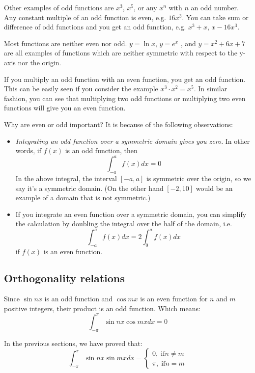 \documentclass[12pt]{report}
\begin{document}
Other examples of odd functions are $x^3$, $x^5$,  or any $x^n$ with $n$ an odd number. Any constant multiple of an odd function is even, e.g. $16x^3$.  You can take sum or difference of odd functions and you get an odd function, e.g. $x^3+x$, $x - 16x^3 $.

Most functions are neither even nor odd. $y= \ln x$, $y = e^x$ , and $y= x^2+6x+7$ are all examples of functions which are neither symmetric with respect to the y-axis nor the origin.

If you multiply an odd function with an even function, you get an odd function. This can be easily seen if you consider the example $x^3 \cdot x^2 = x^5 $. In similar fashion, you can see that multiplying two odd functions or multiplying two even functions will give you an even function.

Why are even or odd important? It is because of the following observations:

\begin{itemize}
\item  \textit{Integrating an odd function over a symmetric domain gives you zero}. In other words, if $f(x)$ is an odd function, then
$$\int_{-a}^{a} f(x) dx =0$$
In the above integral, the interval $[-a,a]$ is symmetric over the origin, so we say it's a symmetric domain. (On the other hand $[-2,10]$ would be an example of a domain that is not symmetric.)

\item  If you integrate an even function over a symmetric domain, you can simplify the calculation by doubling the integral over the half of the domain, i.e.
$$\int_{-a}^{a} f(x) dx = 2 \int_{0}^{a} f(x) dx $$
if $f(x)$ is an even function.
\end{itemize}
	
\subsection*{Orthogonality relations}

Since $\sin nx$ is an odd function and $\cos mx$ is an even function for $n$ and $m$ positive integers, their product is an odd function. Which means:
$$\int_{-\pi}^{\pi} \sin nx \cos mx dx = 0$$

In the previous sections, we have proved that:
$$\int_{-\pi}^{\pi} \sin nx \sin mx dx = \begin{cases} 0, \; \mathrm{ if } n \neq m \\ \pi, \; \mathrm{ if } n = m \end{cases} $$
\end{document}
